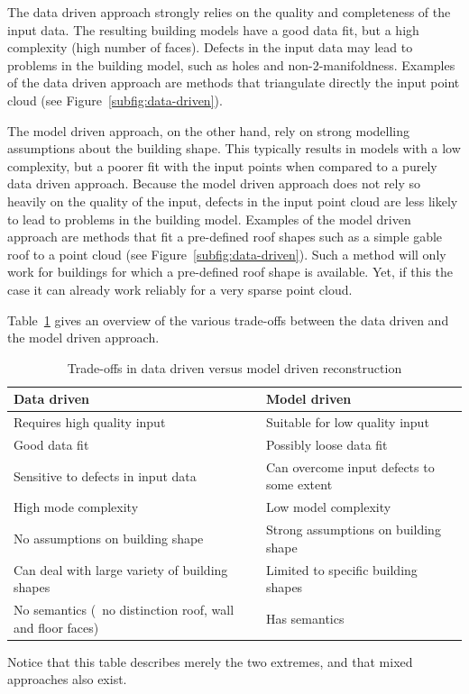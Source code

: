 The data driven approach strongly relies on the quality and completeness of the input data.
The resulting building models have a good data fit, but a high complexity (high number of faces).
Defects in the input data may lead to problems in the building model, such as holes and non-2-manifoldness.
Examples of the data driven approach are methods that triangulate directly the input point cloud (see Figure~\ref{subfig:data-driven}).

The model driven approach, on the other hand, rely on strong modelling assumptions about the building shape.
This typically results in models with a low complexity, but a poorer fit with the input points when compared to a purely data driven approach.
Because the model driven approach does not rely so heavily on the quality of the input, defects in the input point cloud are less likely to lead to problems in the building model.
Examples of the model driven approach are methods that fit a pre-defined roof shapes such as a simple gable roof to a point cloud (see Figure~\ref{subfig:data-driven}). 
Such a method will only work for buildings for which a pre-defined roof shape is available.
Yet, if this the case it can already work reliably for a very sparse point cloud.

Table~\ref{tab:data-vs-model-driven} gives an overview of the various trade-offs between the data driven and the model driven approach. 
\begin{table}[]
	\centering
	\begin{tabular}{p{7cm}|p{7cm}}
	Data driven & Model driven \\
	\hline
	Requires high quality input	& Suitable for low quality input \\
	Good data fit	& Possibly loose data fit \\
	Sensitive to defects in input data &  Can overcome input defects to some extent \\
	High mode complexity & Low model complexity \\
	No assumptions on building shape	&  Strong assumptions on building shape\\
	Can deal with large variety of building shapes	& Limited to specific building shapes\\
	No semantics (\ie\ no distinction roof, wall and floor faces) & Has semantics
	\end{tabular}
	\caption{Trade-offs in data driven versus model driven reconstruction}%
	\label{tab:data-vs-model-driven}
\end{table}
Notice that this table describes merely the two extremes, and that mixed approaches also exist.


